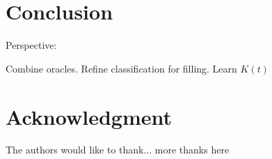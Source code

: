 \documentclass[10pt, conference, compsocconf]{IEEEtran}
\begin{document}
\section{Conclusion} \label{Conclusion}


Perspective: 

Combine oracles. Refine classification for filling. Learn $K(t)$



\section*{Acknowledgment}


The authors would like to thank...
more thanks here








\end{document}
